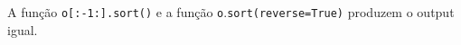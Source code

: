 \documentclass[12pt,varwidth=16cm,border=1pt]{standalone}
\begin{document}
A função \verb+o+\verb+[:-1:].sort()+ e a função \verb+o+.\verb+sort(reverse=True)+ produzem o output igual.

\questiomfalse
\end{document}

